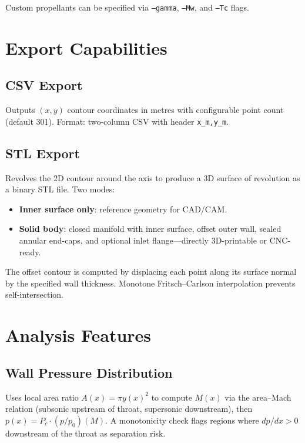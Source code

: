 \documentclass[11pt,a4paper]{article}
\begin{document}
Custom propellants can be specified via \texttt{--gamma}, \texttt{--Mw}, and \texttt{--Tc} flags.

\section{Export Capabilities}

\subsection{CSV Export}
Outputs $(x, y)$ contour coordinates in metres with configurable point count (default 301). Format: two-column CSV with header \texttt{x\_m,y\_m}.

\subsection{STL Export}
Revolves the 2D contour around the axis to produce a 3D surface of revolution as a binary STL file. Two modes:
\begin{itemize}[nosep]
\item \textbf{Inner surface only}: reference geometry for CAD/CAM.
\item \textbf{Solid body}: closed manifold with inner surface, offset outer wall, sealed annular end-caps, and optional inlet flange---directly 3D-printable or CNC-ready.
\end{itemize}

The offset contour is computed by displacing each point along its surface normal by the specified wall thickness. Monotone Fritsch--Carlson interpolation prevents self-intersection.

\section{Analysis Features}

\subsection{Wall Pressure Distribution}
Uses local area ratio $A(x) = \pi y(x)^2$ to compute $M(x)$ via the area--Mach relation (subsonic upstream of throat, supersonic downstream), then $p(x) = P_c \cdot (p/p_0)(M)$. A monotonicity check flags regions where $dp/dx > 0$ downstream of the throat as separation risk.
\end{document}
